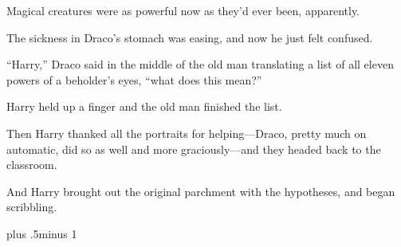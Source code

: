 Magical creatures were as powerful now as they’d ever been, apparently.

The sickness in Draco’s stomach was easing, and now he just felt confused.

“Harry,” Draco said in the middle of the old man translating a list of all eleven powers of a beholder’s eyes, “what does this mean?”

Harry held up a finger and the old man finished the list.

Then Harry thanked all the portraits for helping—Draco, pretty much on automatic, did so as well and more graciously—and they headed back to the classroom.

And Harry brought out the original parchment with the hypotheses, and began scribbling.

\baselineskip plus .5\textheight minus 1\baselineskip

\savetrivseps
\setlength{\topsep}{0pt}
\setlength{\partopsep}{0pt}

